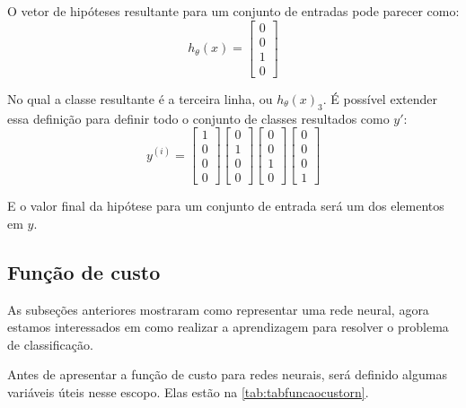 O vetor de hipóteses resultante para um conjunto de entradas pode parecer como:
\begin{equation}
h_{\theta}(x) = \begin{bmatrix} 0 \\ 0 \\ 1 \\ 0 \end{bmatrix} \nonumber
\end{equation}

No qual a classe resultante é a terceira linha, ou $h_{\theta}(x)_3$. É possível extender essa definição para definir todo o conjunto de classes resultados como $y'$:
\begin{equation}
y^{(i)} = \begin{bmatrix} 1 \\ 0 \\ 0 \\ 0 \end{bmatrix} \begin{bmatrix} 0 \\ 1 \\ 0 \\ 0 \end{bmatrix} \begin{bmatrix} 0 \\ 0 \\ 1 \\ 0 \end{bmatrix} \begin{bmatrix} 0 \\ 0 \\ 0 \\ 1 \end{bmatrix} \nonumber
\end{equation}

E o valor final da hipótese para um conjunto de entrada será um dos elementos em $y$.


\subsection{Função de custo}

As subseções anteriores mostraram como representar uma rede neural, agora estamos interessados em como realizar a aprendizagem para resolver o problema de classificação.

Antes de apresentar a função de custo para redes neurais, será definido algumas variáveis úteis nesse escopo. Elas estão na \autoref{tab:tabfuncaocustorn}.

